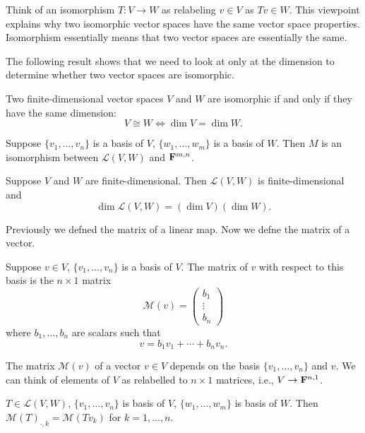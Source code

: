 \begin{remark}
Think of an isomorphism $T:V\to W$ as relabeling $v\in V$ as $Tv\in W$. This viewpoint explains why two isomorphic vector spaces have the same vector space properties. Isomorphism essentially means that two vector spaces are essentially the same.
\end{remark}

The following result shows that we need to look at only at the dimension to determine whether two vector spaces are isomorphic.

\begin{lemma}
Two finite-dimensional vector spaces $V$ and $W$ are isomorphic if and only if they have the same dimension:
\[V\cong W\iff\dim V=\dim W.\]
\end{lemma}

\begin{proposition}
Suppose $\{v_1,\dots,v_n\}$ is a basis of $V$, $\{w_1,\dots,w_m\}$ is a basis of $W$. Then $M$ is an isomorphism between $\mathcal{L}(V,W)$ and $\mathbf F^{m,n}$.
\end{proposition}

\begin{corollary}\label{cor:dimension-product}
Suppose $V$ and $W$ are finite-dimensional. Then $\mathcal{L}(V,W)$ is finite-dimensional and
\[\dim\mathcal{L}(V,W)=(\dim V)(\dim W).\]
\end{corollary}

Previously we defned the matrix of a linear map. Now we defne the matrix of a vector.

\begin{definition}
Suppose $v\in V$, $\{v_1,\dots,v_n\}$ is a basis of $V$. The matrix of $v$ with respect to this basis is the $n\times1$ matrix
\[\mathcal{M}(v)=\begin{pmatrix}
b_1\\\vdots\\b_n
\end{pmatrix}\]
where $b_1,\dots,b_n$ are scalars such that
\[v=b_1v_1+\cdots+b_nv_n.\]
\end{definition}

\begin{remark}
The matrix $\mathcal{M}(v)$ of a vector $v\in V$ depends on the basis $\{v_1,\dots,v_n\}$ and $v$. We can think of elements of $V$ as relabelled to $n\times1$ matrices, i.e., $V\to\mathbf F^{n,1}$.
\end{remark}

\begin{lemma}
$T\in\mathcal{L}(V,W)$, $\{v_1,\dots,v_n\}$ is basis of $V$, $\{w_1,\dots,w_m\}$ is basis of $W$. Then $\mathcal{M}(T)_{\cdot,k}=\mathcal{M}(Tv_k)$ for $k=1,\dots,n$.
\end{lemma}

